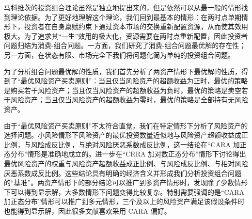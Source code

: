 

\begin{tcolorbox}[summary,title=本章小结]
马科维茨的投资组合理论虽然是独立地提出来的，但是依然可以从最一般的情形找到理论依据。为了更好地理解这个理论，我们回到最基本的情形：在两时点单期情形下，投资者在自身禀赋约束下通过资本市场的交换重新配置资源，从而使其效用极大。为了追求其“一生”效用的极大化，资源需要在两时点重新配置，因此投资者问题归结为消费-组合问题。一方面，我们研究了消费-组合问题最优解的存在性；另一方面，在状态有限、市场完全下我们将问题化简为单纯的投资组合问题。

为了分析组合问题最优解的性质，我们首先分析了两资产情形下最优解的性质，得到了“最优风险资产买卖原则”：当且仅当风险资产的超额收益为正时，最优的策略是购买若干风险资产；当且仅当风险资产的超额收益为负时，最优的策略是卖空若干风险资产；当且仅当风险资产的超额收益为零时，最优的策略是全部持有无风险资产。

由于“最优风险资产买卖原则”不太符合直觉，我们在特定情形下分析了风险资产的选择问题。小风险情形下风险资产的最优投资数量近似地与风险资产超额收益成正比例，与风险成反比例，与绝对风险厌恶系数成反比例，这一结论在“CARA 加正态分布”情形是准确地成立的。进一步在“CRRA 加对数正态分布”情形下讨论得出最优风险资产的权重与风险资产超额收益成正比例、与风险成反比例、与相对风险厌恶系数成反比例。这些结论具有明确的经济含义并形成我们分析投资组合问题的“基准”。两资产情形下的部分结论可以推广到多资产情形时，发现除了少数情形下可以得到显示解，大多数情形下问题变得比较复杂。特别需要强调的是“CARA 加正态分布”情形可以推广到多元情形，三个及以上的风险资产满足该假设条件时也能得到显示解，因此很多文献喜欢采用 CARA 偏好。
\end{tcolorbox}



